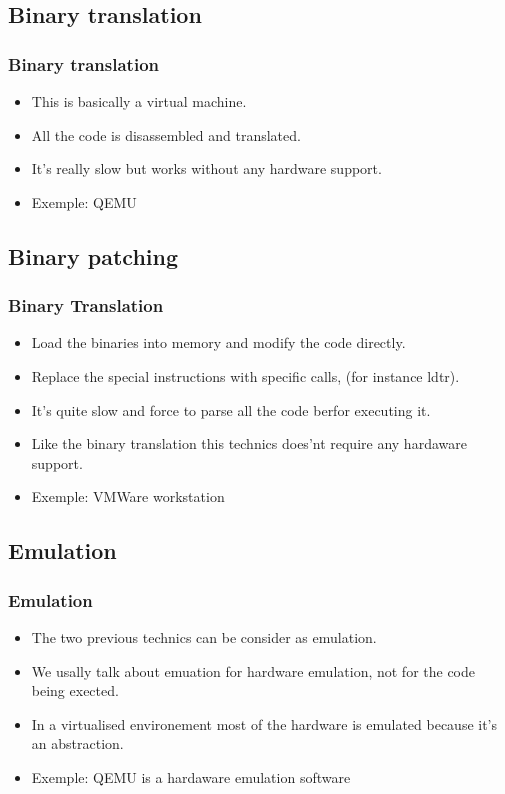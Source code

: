 \subsection{Binary translation}
\begin{frame}
\frametitle{Binary translation}
\begin{itemize}
\item This is basically a virtual machine.
\item All the code is disassembled and translated.
\item It's really slow but works without any hardware support.
\item Exemple: QEMU
\end{itemize}
\end{frame}

\subsection{Binary patching}
\begin{frame}
\frametitle{Binary Translation}
\begin{itemize}
  \item Load the binaries into memory and modify the code directly.
  \item Replace the special instructions with specific calls, (for
  instance ldtr).
  \item It's quite slow and force to parse all the code berfor executing
  it.
  \item Like the binary translation this technics does'nt require any
  hardaware support.
  \item Exemple: VMWare workstation
\end{itemize}
\end{frame}

\subsection{Emulation}
\begin{frame}
\frametitle{Emulation}
\begin{itemize}
\item The two previous technics can be consider as emulation.
\item We usally talk about emuation for hardware emulation, not
for the code being exected.
\item In a virtualised environement most of the hardware is emulated
because it's an abstraction.
\item Exemple: QEMU is a hardaware emulation software
\end{itemize}
\end{frame}

